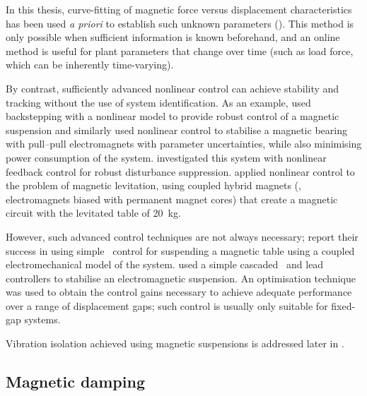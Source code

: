 \documentclass[11pt,a4paper]{memoir}
\begin{document}
In this thesis, curve-fitting of magnetic force versus displacement characteristics has been used \emph{a priori} to establish such unknown parameters ().
This method is only possible when sufficient information is known beforehand, and an online method is useful for plant parameters that change over time (such as load force, which can be inherently time-varying).

By contrast, sufficiently advanced nonlinear control can achieve stability and tracking without the use of system identification.
As an example, \textcite{mahmoud2003} used backstepping with a nonlinear model to provide robust control of a magnetic suspension and \textcite{queiroz2007} similarly used nonlinear control to stabilise a magnetic bearing with pull--pull electromagnets with parameter uncertainties, while also minimising power consumption of the system.
\textcite{gentili2003} investigated this system with nonlinear feedback control for robust disturbance suppression.
\textcite{chang2001} applied nonlinear control to the problem of magnetic levitation, using coupled hybrid magnets (\ie, electromagnets biased with permanent magnet cores) that create a magnetic circuit with the levitated table of \SI{20}{kg}.

However, such advanced control techniques are not always necessary; \textcite{li2007} report their success in using simple \PID\ control for suspending a magnetic table using a coupled electromechanical model of the system.
\textcite{banerjee2008} used a simple cascaded \PI\ and lead controllers to stabilise an electromagnetic suspension.
An optimisation technique was used to obtain the control gains necessary to achieve adequate performance over a range of displacement gaps; such control is usually only suitable for fixed-gap systems.

Vibration isolation achieved using magnetic suspensions is addressed later in .




\subsection{Magnetic damping}
\end{document}
